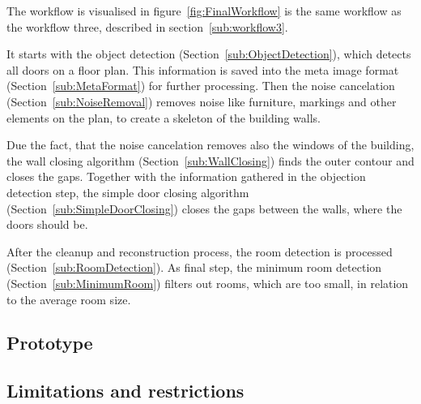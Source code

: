 The workflow is visualised in figure~\ref{fig:FinalWorkflow} is the same workflow as the workflow three, described in section~\ref{sub:workflow3}.

It starts with the object detection (Section~\ref{sub:ObjectDetection}), which detects all doors on a floor plan. This information is saved into the meta image format (Section~\ref{sub:MetaFormat}) for further processing. Then the noise cancelation (Section~\ref{sub:NoiseRemoval}) removes noise like furniture, markings and other elements on the plan, to create a skeleton of the building walls.

Due the fact, that the noise cancelation removes also the windows of the building, the wall closing algorithm (Section~\ref{sub:WallClosing}) finds the outer contour and closes the gaps. Together with the information gathered in the objection detection step, the simple door closing algorithm (Section~\ref{sub:SimpleDoorClosing}) closes the gaps between the walls, where the doors should be.

After the cleanup and reconstruction process, the room detection is processed (Section~\ref{sub:RoomDetection}). As final step, the minimum room detection (Section~\ref{sub:MinimumRoom}) filters out rooms, which are too small, in relation to the average room size.


\subsection{Prototype}

\subsection{Limitations and restrictions}